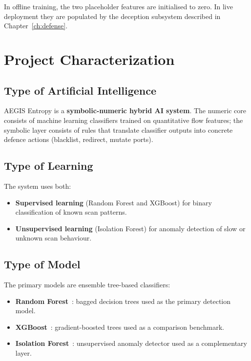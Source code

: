 In offline training, the two placeholder features are initialised to zero. In live deployment they are populated by the deception subsystem described in Chapter~\ref{ch:defense}.

\section{Project Characterization}

\subsection{Type of Artificial Intelligence}

AEGIS Entropy is a \textbf{symbolic-numeric hybrid AI system}. The numeric core consists of machine learning classifiers trained on quantitative flow features; the symbolic layer consists of rules that translate classifier outputs into concrete defence actions (blacklist, redirect, mutate ports).

\subsection{Type of Learning}

The system uses both:

\begin{itemize}
    \item \textbf{Supervised learning} (Random Forest and XGBoost) for binary classification of known scan patterns.
    \item \textbf{Unsupervised learning} (Isolation Forest) for anomaly detection of slow or unknown scan behaviour.
\end{itemize}

\subsection{Type of Model}

The primary models are ensemble tree-based classifiers:

\begin{itemize}
    \item \textbf{Random Forest}~\cite{breiman2001}: bagged decision trees used as the primary detection model.
    \item \textbf{XGBoost}~\cite{chen2016}: gradient-boosted trees used as a comparison benchmark.
    \item \textbf{Isolation Forest}~\cite{liu2008}: unsupervised anomaly detector used as a complementary layer.
\end{itemize}


